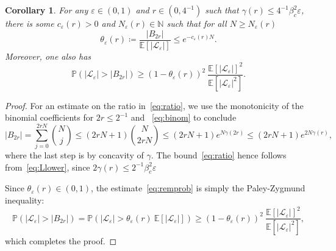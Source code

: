 \documentclass[10pt,a4paper]{amsart}
\newtheorem{cor}{Corollary}
\newcommand{\eps}{\varepsilon}
\begin{document}
\begin{cor}\label{cor:P1}
    For any $ \varepsilon \in (0,1) $ and $ r \in (0,4^{-1}) $ such that
    $
        \gamma(r) \leq 4^{-1} \beta_c^2  \varepsilon $, 
    there is some $ c_{\varepsilon}(r) > 0 $ and $ N_\varepsilon(r) \in \mathbb{N} $ such that for all $ N \geq N_\varepsilon(r) $ 
    \begin{equation}\label{eq:ratio}
    \theta_\varepsilon(r) \coloneqq \frac{|B_{2r}|}{\mathbb{E}\left[| \mathcal{L}_{\varepsilon}  | \right] } \leq e^{- c_{\varepsilon}(r) N } .
    \end{equation}
    Moreover, one also has
    \begin{equation}\label{eq:remprob}
        \mathbb{P}\left( |\mathcal{L}_\varepsilon | > |B_{2r}| \right) \geq \left(1-\theta_\varepsilon(r)\right)^2 \ \frac{\mathbb{E}\left[| \mathcal{L}_{\varepsilon}  | \right]^2 }{\mathbb{E}\left[| \mathcal{L}_{\varepsilon}  |^2 \right]} . 
    \end{equation}
\end{cor}

\begin{proof}
    For an estimate on the ratio in~\eqref{eq:ratio}, we use the monotonicity of the binomial coefficients for $ 2r \leq 2^{-1} $ and ~\eqref{eq:binom} to conclude
    $$
        |B_{2r}| = \sum_{j=0}^{2rN} \binom{N}{j} \leq (2rN+1) \binom{N}{2rN} \leq (2rN+1) e^{N\gamma(2r) } \leq (2rN+1) e^{2N \gamma(r)},
    $$
    where the last step is by concavity of $ \gamma $.
    The bound~\eqref{eq:ratio} hence follows from~\eqref{eq:Llower}, since $2\gamma(r)\leq 2^{-1}\beta_c^2\eps$

   Since $  \theta_\varepsilon(r) \in (0,1) $, the estimate~\eqref{eq:remprob} is simply the Paley-Zygmund inequality:
   $$
    \mathbb{P}\left( |\mathcal{L}_\varepsilon | > |B_{2r}| \right) = \mathbb{P}\left( |\mathcal{L}_\varepsilon | > \theta_\varepsilon(r) \ \mathbb{E}\left[| \mathcal{L}_{\varepsilon}  | \right]\right) \geq ( 1- \theta_\varepsilon(r) )^2 \  
    \frac{\mathbb{E}\left[| \mathcal{L}_{\varepsilon}  | \right]^2 }{\mathbb{E}\left[| \mathcal{L}_{\varepsilon}  |^2 \right]} , 
    $$
    which completes the proof.
\end{proof}
\end{document}
